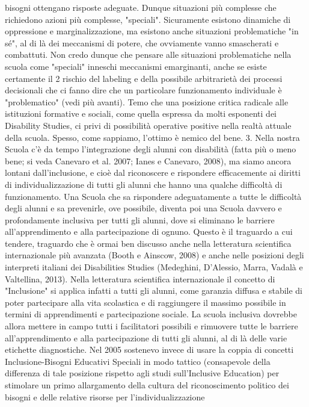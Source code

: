 bisogni ottengano risposte adeguate. Dunque situazioni più complesse che richiedono azioni più
complesse, "speciali". Sicuramente esistono dinamiche di oppressione e marginalizzazione, ma
esistono anche situazioni problematiche "in sé", al di là dei meccanismi di potere, che ovviamente
vanno smascherati e combattuti. Non credo dunque che pensare alle situazioni problematiche
nella scuola come "speciali" inneschi meccanismi emarginanti, anche se esiste certamente il
2
rischio del labeling e della possibile arbitrarietà dei processi decisionali che ci fanno dire che un
particolare funzionamento individuale è "problematico" (vedi più avanti). Temo che una posizione
critica radicale alle istituzioni formative e sociali, come quella espressa da molti esponenti dei
Disability Studies, ci privi di possibilità operative positive nella realtà attuale della scuola. Spesso,
come sappiamo, l'ottimo è nemico del bene.
3. Nella nostra Scuola c’è da tempo l’integrazione degli alunni con disabilità (fatta più o meno
bene; si veda Canevaro et al. 2007; Ianes e Canevaro, 2008), ma siamo ancora lontani
dall’inclusione, e cioè dal riconoscere e rispondere efficacemente ai diritti di individualizzazione di
tutti gli alunni che hanno una qualche difficoltà di funzionamento.
Una Scuola che sa rispondere adeguatamente a tutte le difficoltà degli alunni e sa prevenirle,
ove possibile, diventa poi una Scuola davvero e profondamente inclusiva per tutti gli alunni, dove si
eliminano le barriere all’apprendimento e alla partecipazione di ognuno. Questo è il traguardo a
cui tendere, traguardo che è ormai ben discusso anche nella letteratura scientifica internazionale
più avanzata (Booth e Ainscow, 2008) e anche nelle posizioni degli interpreti italiani dei Disabilities
Studies (Medeghini, D'Alessio, Marra, Vadalà e Valtellina, 2013). Nella letteratura scientifica
internazionale il concetto di "Inclusione" si applica infatti a tutti gli alunni, come garanzia diffusa e
stabile di poter partecipare alla vita scolastica e di raggiungere il massimo possibile in termini di
apprendimenti e partecipazione sociale. La scuola inclusiva dovrebbe allora mettere in campo tutti
i facilitatori possibili e rimuovere tutte le barriere all'apprendimento e alla partecipazione di tutti
gli alunni, al di là delle varie etichette diagnostiche. Nel 2005 sostenevo invece di usare la coppia di
concetti Inclusione-Bisogni Educativi Speciali in modo tattico (consapevole della differenza di tale
posizione rispetto agli studi sull'Inclusive Education) per stimolare un primo allargamento della
cultura del riconoscimento politico dei bisogni e delle relative risorse per l'individualizzazione
